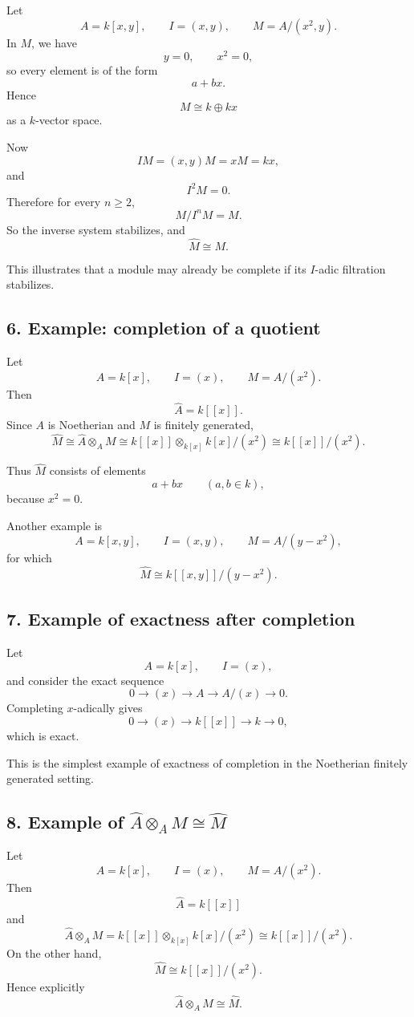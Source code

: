 \documentclass[12pt,a4paper]{article}
\theoremstyle{plain}
\theoremstyle{definition}      %
\begin{document}
Let
\[
A=k[x,y],\qquad I=(x,y),\qquad M=A/(x^2,y).
\]
In \(M\), we have
\[
y=0,\qquad x^2=0,
\]
so every element is of the form
\[
a+bx.
\]
Hence
\[
M\cong k\oplus kx
\]
as a \(k\)-vector space.

Now
\[
IM=(x,y)M=xM=kx,
\]
and
\[
I^2M=0.
\]
Therefore for every \(n\ge2\),
\[
M/I^nM=M.
\]
So the inverse system stabilizes, and
\[
\widehat M\cong M.
\]

This illustrates that a module may already be complete if its \(I\)-adic filtration stabilizes.

\subsection*{6. Example: completion of a quotient}

Let
\[
A=k[x],\qquad I=(x),\qquad M=A/(x^2).
\]
Then
\[
\widehat A=k[[x]].
\]
Since \(A\) is Noetherian and \(M\) is finitely generated,
\[
\widehat M \cong \widehat A\otimes_A M
\cong k[[x]]\otimes_{k[x]} k[x]/(x^2)
\cong k[[x]]/(x^2).
\]

Thus \(\widehat M\) consists of elements
\[
a+bx
\qquad (a,b\in k),
\]
because \(x^2=0\).

Another example is
\[
A=k[x,y],\qquad I=(x,y),\qquad M=A/(y-x^2),
\]
for which
\[
\widehat M\cong k[[x,y]]/(y-x^2).
\]

\subsection*{7. Example of exactness after completion}

Let
\[
A=k[x],\qquad I=(x),
\]
and consider the exact sequence
\[
0\to (x)\to A\to A/(x)\to 0.
\]
Completing \(x\)-adically gives
\[
0\to (x)\to k[[x]]\to k\to 0,
\]
which is exact.

This is the simplest example of exactness of completion in the Noetherian finitely generated setting.

\subsection*{8. Example of \(\widehat A\otimes_A M\cong \widehat M\)}

Let
\[
A=k[x],\qquad I=(x),\qquad M=A/(x^2).
\]
Then
\[
\widehat A = k[[x]]
\]
and
\[
\widehat A\otimes_A M
=
k[[x]]\otimes_{k[x]} k[x]/(x^2)
\cong k[[x]]/(x^2).
\]
On the other hand,
\[
\widehat M\cong k[[x]]/(x^2).
\]
Hence explicitly
\[
\widehat A\otimes_A M \cong \widehat M.
\]
\end{document}
